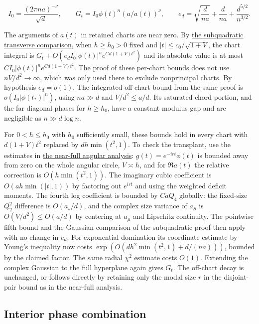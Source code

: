 \begin{equation*}
I_0=\frac{(2\pi na)^{-\nu}}{\sqrt d},\qquad
G_t=I_0\phi(t)^n(a/a(t))^\nu,\qquad
e_d=\sqrt{\frac d{na}}+\frac d{na}+\frac{d^{5/2}}{n^{3/2}}.
\end{equation*}

The arguments of $a(t)$ in retained charts are near zero. By \hyperref[sec:subquadratic-interior-saddle]{the subquadratic transverse comparison}, when $h\ge h_0>0$ fixed and $|t|\le c_0/\sqrt{1+V}$, the chart integral is $G_t+O(e_d I_0|\phi(t)|^n e^{Cd(1+V)t^2})$ and its absolute value is at most $C I_0|\phi(t)|^n e^{Cd(1+V)t^2}$. The proof of these per-chart bounds does not use $nV/d^2\to\infty$, which was only used there to exclude nonprincipal charts. By hypothesis $e_d=o(1)$. The integrated off-chart bound from the same proof is $o(I_0|\phi(t_*)|^n)$, using $na\gg d$ and $V/d^2\le a/d$. Its saturated chord portion, and the far diagonal phases for $h\ge h_0$, have a constant modulus gap and are negligible as $n\gg d\log n$.

For $0<h\le h_0$ with $h_0$ sufficiently small, these bounds hold in every chart with $d(1+V)t^2$ replaced by $dh\min(t^2,1)$. To check the transplant, use the estimates in \href{https://github.com/ProgramComputer/open-math-research/blob/4fb624ba937a8eecc1361a6066185cd81ab7b172/topics/balanced-arrays/quadratic/near-full-all-angular-signs.md}{the near-full angular analysis}: $g(t)=e^{-irt}\phi(t)$ is bounded away from zero on the whole angular circle, $V\asymp h$, and for $\Re a(t)$ the relative correction is $O(h\min(t^2,1))$. The imaginary cubic coefficient is $O(ah\min(|t|,1))$ by factoring out $e^{irt}$ and using the weighted deficit moments. The fourth log coefficient is bounded by $CaQ_4$ globally: the fixed-size $Q_2^2$ difference is $O(a_s/d)$, and the complex size variance of $a_S$ is $O(V/d^2)\le O(a/d)$ by centering at $a_\mu$ and Lipschitz continuity. The pointwise fifth bound and the Gaussian comparison of the subquadratic proof then apply with no change in $e_d$. For exponential domination its coordinate estimate by Young's inequality now costs $\exp(O(dh^2\min(t^2,1)+d/(na)))$, bounded by the claimed factor. The same radial $\chi^2$ estimate costs $O(1)$. Extending the complex Gaussian to the full hyperplane again gives $G_t$. The off-chart decay is unchanged, or follows directly by retaining only the modal size $r$ in the disjoint-pair bound as in the near-full analysis.

\subsection{Interior phase combination}

